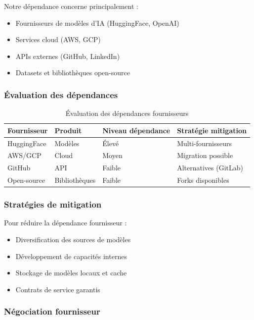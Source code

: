 \documentclass[12pt,a4paper]{report}
\begin{document}
Notre dépendance concerne principalement :
\begin{itemize}
\item Fournisseurs de modèles d'IA (HuggingFace, OpenAI)
\item Services cloud (AWS, GCP)
\item APIs externes (GitHub, LinkedIn)
\item Datasets et bibliothèques open-source
\end{itemize}

\subsubsection{Évaluation des dépendances}

\begin{table}[H]
\centering
\caption{Évaluation des dépendances fournisseurs}
\label{tab:fournisseurs}
\begin{tabular}{@{}llll@{}}
\toprule
Fournisseur & Produit & Niveau dépendance & Stratégie mitigation \\
\midrule
HuggingFace & Modèles & Élevé & Multi-fournisseurs \\
AWS/GCP & Cloud & Moyen & Migration possible \\
GitHub & API & Faible & Alternatives (GitLab) \\
Open-source & Bibliothèques & Faible & Forks disponibles \\
\bottomrule
\end{tabular}
\end{table}

\subsubsection{Stratégies de mitigation}

Pour réduire la dépendance fournisseur :
\begin{itemize}
\item Diversification des sources de modèles
\item Développement de capacités internes
\item Stockage de modèles locaux et cache
\item Contrats de service garantis
\end{itemize}

\subsubsection{Négociation fournisseur}
\end{document}
